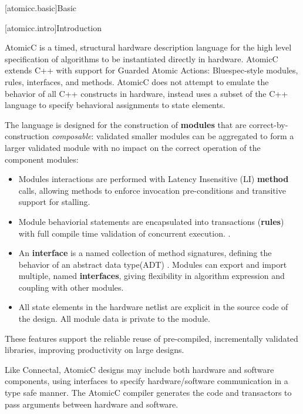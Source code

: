 [atomicc.basic]{Basic}

[atomicc.intro]{Introduction}

AtomicC is a timed, structural hardware description language for
the high level specification of algorithms to be instantiated
directly in hardware.
AtomicC extends C++
with support for Guarded Atomic Actions:
Bluespec-style\cite{Bluespec:www,Hoe:Thesis,HoeArvind:TRS_Synthesis2}
modules, rules, interfaces, and methods.
AtomicC does not attempt to emulate the behavior of all C++ constructs in hardware,
instead uses a subset of the C++ language to specify behavioral
assignments to state elements.

The language is designed for
the construction of \textbf{modules} that are correct-by-construction \textit{composable}:
validated smaller modules can be aggregated to form
a larger validated module with no impact on the correct
operation of the component modules:
\begin{itemize}
\item Modules interactions are performed with Latency Insensitive (LI)
\cite{carloni2001theory}
\textbf{method} calls, allowing methods to enforce invocation pre-conditions
and transitive support for stalling.
\item Module behaviorial statements are encapsulated into transactions (\textbf{rules})
with full compile time validation of concurrent execution.
\cite{NikhilSemantics}
\cite{harris2005composable}.
\cite{nurvitadhi2011automatic}
\cite{fox2003algebraic}
\item An \textbf{interface} is a named collection of method signatures, defining
the behavior of an abstract data type(ADT) \cite{Liskov74programmingwith}.
Modules can export and import
multiple, named \textbf{interfaces},
giving flexibility in algorithm expression and coupling with other modules.
\item All state elements in the hardware
netlist are explicit in the source code of the design.
All module data is private to the module.
\end{itemize}
These features support the reliable reuse of pre-compiled, incrementally validated
libraries, improving productivity on large designs.

Like Connectal, AtomicC designs may include both hardware and
software components, using interfaces to specify hardware/software communication
in a type safe manner. The AtomicC compiler generates the code and transactors to pass
arguments between hardware and software.

